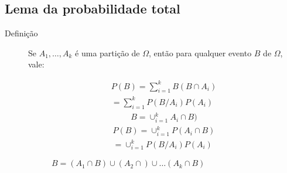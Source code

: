 \documentclass[11pt,a4paper]{book}
\begin{document}
   \subsection{Lema da probabilidade total}
   \begin{description}
     \item [Definição] Se $A_1,\ldots, A_k$ é uma partição de $\Omega$, então para qualquer evento $B$ de $\Omega$, vale:

       \begin{align}
         P(B)= \sum^k_{i=1} B(B \cap A_i)\\ \nonumber
         = \sum^k_{i=1} P(B/A_i)P(A_i)
       \end{align}
       \begin{align}
         B= \cup_{i=1}^k A_i \cap B)
       \end{align}
       \begin{align}
         P(B)= \cup_{i=1}^k P(A_i \cap B)\\ \nonumber
         = \cup_{i=1}^k P(B/A_i)P(A_i)
       \end{align}
       \begin{figure}[htpb]
         \centering
         \caption{$B=(A_1 \cap B) \cup (A_2 \cap)\cup \dots (A_k \cap B)$ }
         \label{fig:20}
       \end{figure}
   \end{description}
\end{document}
